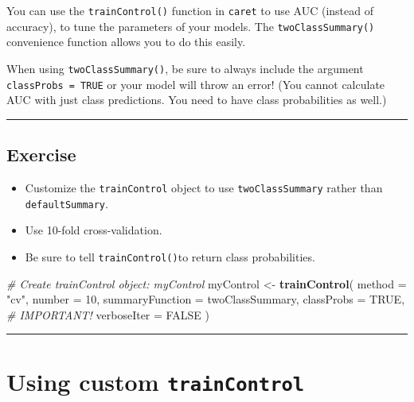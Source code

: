 \documentclass[]{book}
\newenvironment{Shaded}{\begin{snugshade}}{\end{snugshade}}
\newcommand{\KeywordTok}[1]{\textcolor[rgb]{0.13,0.29,0.53}{\textbf{#1}}}
\newcommand{\DataTypeTok}[1]{\textcolor[rgb]{0.13,0.29,0.53}{#1}}
\newcommand{\DecValTok}[1]{\textcolor[rgb]{0.00,0.00,0.81}{#1}}
\newcommand{\StringTok}[1]{\textcolor[rgb]{0.31,0.60,0.02}{#1}}
\newcommand{\CommentTok}[1]{\textcolor[rgb]{0.56,0.35,0.01}{\textit{#1}}}
\newcommand{\OtherTok}[1]{\textcolor[rgb]{0.56,0.35,0.01}{#1}}
\newcommand{\NormalTok}[1]{#1}
\begin{document}
You can use the \texttt{trainControl()} function in \texttt{caret} to
use AUC (instead of accuracy), to tune the parameters of your models.
The \texttt{twoClassSummary()} convenience function allows you to do
this easily.

When using \texttt{twoClassSummary()}, be sure to always include the
argument \texttt{classProbs\ =\ TRUE} or your model will throw an error!
(You cannot calculate AUC with just class predictions. You need to have
class probabilities as well.)

\begin{center}\rule{0.5\linewidth}{\linethickness}\end{center}

\subsection*{Exercise}\label{exercise-15}

\begin{itemize}
\item
  Customize the \texttt{trainControl} object to use
  \texttt{twoClassSummary} rather than \texttt{defaultSummary}.
\item
  Use 10-fold cross-validation.
\item
  Be sure to tell \texttt{trainControl()}to return class probabilities.
\end{itemize}

\begin{Shaded}
\begin{Highlighting}[]
\CommentTok{# Create trainControl object: myControl}
\NormalTok{myControl <-}\StringTok{ }\KeywordTok{trainControl}\NormalTok{(}
  \DataTypeTok{method =} \StringTok{"cv"}\NormalTok{,}
  \DataTypeTok{number =} \DecValTok{10}\NormalTok{,}
  \DataTypeTok{summaryFunction =}\NormalTok{ twoClassSummary,}
  \DataTypeTok{classProbs =} \OtherTok{TRUE}\NormalTok{, }\CommentTok{# IMPORTANT!}
  \DataTypeTok{verboseIter =} \OtherTok{FALSE}
\NormalTok{)}
\end{Highlighting}
\end{Shaded}

\begin{center}\rule{0.5\linewidth}{\linethickness}\end{center}

\section{\texorpdfstring{Using custom
\texttt{trainControl}}{Using custom trainControl}}\label{using-custom-traincontrol}
\end{document}
